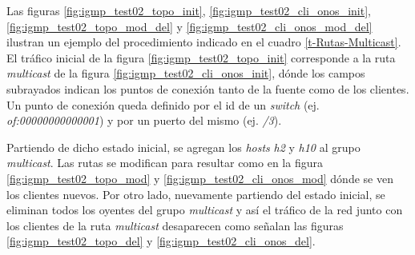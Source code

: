 Las figuras \ref{fig:igmp_test02_topo_init}, \ref{fig:igmp_test02_cli_onos_init}, \ref{fig:igmp_test02_topo_mod_del} y \ref{fig:igmp_test02_cli_onos_mod_del} ilustran un ejemplo del procedimiento indicado en el cuadro \ref{t-Rutas-Multicast}. El tráfico inicial de la figura \ref{fig:igmp_test02_topo_init} corresponde a la ruta \textit{multicast} de la figura \ref{fig:igmp_test02_cli_onos_init}, dónde los campos subrayados indican los puntos de conexión tanto de la fuente como de los clientes. Un punto de conexión queda definido por el id de un \textit{switch} (ej. \textit{of:00000000000001}) y por un puerto del mismo (ej. \textit{/3}).

Partiendo de dicho estado inicial, se agregan los \textit{hosts} \textit{h2} y \textit{h10} al grupo \textit{multicast}. Las rutas se modifican para resultar como en la figura \ref{fig:igmp_test02_topo_mod} y \ref{fig:igmp_test02_cli_onos_mod} dónde se ven los clientes nuevos. Por otro lado, nuevamente partiendo del estado inicial, se eliminan todos los oyentes del grupo \textit{multicast} y así el tráfico de la red junto con los clientes de la ruta \textit{multicast} desaparecen como señalan las figuras \ref{fig:igmp_test02_topo_del} y \ref{fig:igmp_test02_cli_onos_del}.

